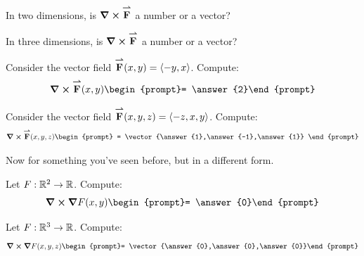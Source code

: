 \documentclass{ximera}
\begin{document}
\begin{question}
  In two dimensions, is $\boldsymbol\nabla\boldsymbol\times{\overset{\boldsymbol{\rightharpoonup}}{\mathbf{F}}}$ a number or a vector?
  \begin{prompt}
  \begin{multipleChoice}
  \end{multipleChoice}
  \end{prompt}
  \begin{question}
    In three dimensions, is $\boldsymbol\nabla\boldsymbol\times{\overset{\boldsymbol{\rightharpoonup}}{\mathbf{F}}}$ a number or a vector?
    \begin{prompt}
      \begin{multipleChoice}
      \end{multipleChoice}
    \end{prompt}
    \end{question}
\end{question}


\begin{question}
  Consider the vector field ${\overset{\boldsymbol{\rightharpoonup}}{\mathbf{F}}}(x,y) = \left\langle -y,x\right\rangle$. Compute:
  \[
  \curl\vec{F}(x,y) \begin{prompt}= \answer{2}\end{prompt}
  \]
  \begin{question}
    Consider the vector field ${\overset{\boldsymbol{\rightharpoonup}}{\mathbf{F}}}(x,y,z) = \left\langle -z,x,y\right\rangle$. Compute:
    \[
    \curl\vec{F}(x,y,z)   \begin{prompt}
      = \vector{\answer{1},\answer{-1},\answer{1}}
    \end{prompt}
    \]
  \end{question}
\end{question}

Now for something you've seen before, but in a different form.

\begin{question}
  Let $F:\mathbb R^2\to\mathbb R$. Compute:
  \[
  \curl\grad F(x,y) \begin{prompt}= \answer{0}\end{prompt}
  \]
  \begin{question}
    Let $F:\mathbb R^3\to\mathbb R$. Compute:
    \[
    \curl\grad F(x,y,z) \begin{prompt}= \vector{\answer{0},\answer{0},\answer{0}}\end{prompt}
    \] 
  \end{question}
\end{question}
\end{document}
